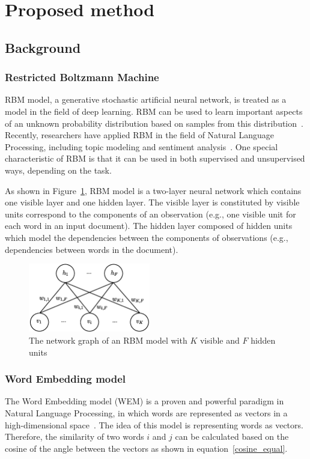 \section{Proposed method}\label{proposed-method}
\subsection{Background}
\subsubsection{Restricted Boltzmann Machine}

RBM model, a generative stochastic artificial neural network, is treated as a model in the field of deep learning.
RBM can be used to learn important aspects of an unknown probability distribution based on samples from this distribution~\cite{Fischer2012}.
Recently, researchers have applied RBM in the field of Natural Language Processing, including topic modeling and sentiment analysis~\cite{serbm}.
One special characteristic of RBM is that it can be used in both supervised and unsupervised ways, depending on the task.

As shown in Figure~\ref{fig:rbm1}, RBM model is a two-layer neural network which contains one visible layer and one hidden layer.
The visible layer is constituted by visible units correspond to the components of an observation (e.g., one visible unit for each word in an input document).
The hidden layer composed of hidden units which model the dependencies between the components of observations (e.g., dependencies between words in the document).

\begin{figure}
	\centering
	\includegraphics[height=3cm]{BasicRBM}
	\caption{The network graph of an RBM model with $K$ visible and  $F$ hidden units}
	\label{fig:rbm1}
\end{figure}

\subsubsection{Word Embedding model}

The Word Embedding model (WEM) is a proven and powerful paradigm in Natural Language Processing, in which words are represented as vectors in a high-dimensional space~\cite{Quoc_Le}.
The idea of this model is representing words as vectors.
Therefore, the similarity of two words $i$ and $j$ can be calculated based on the cosine of the angle between the vectors as shown in equation~\ref{cosine_equal}.

